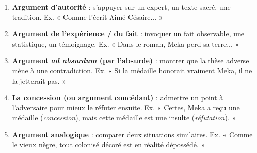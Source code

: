 \documentclass[11pt]{article}
\begin{document}
\begin{methode}
\begin{enumerate}
    \item \textbf{Argument d'autorité} : s'appuyer sur un expert, un texte sacré, une tradition. Ex. « Comme l'écrit Aimé Césaire... »
    \item \textbf{Argument de l'expérience / du fait} : invoquer un fait observable, une statistique, un témoignage. Ex. « Dans le roman, Meka perd sa terre... »
    \item \textbf{Argument \emph{ad absurdum} (par l'absurde)} : montrer que la thèse adverse mène à une contradiction. Ex. « Si la médaille honorait vraiment Meka, il ne la jetterait pas. »
    \item \textbf{La concession (ou argument concédant)} : admettre un point à l'adversaire pour mieux le réfuter ensuite. Ex. « Certes, Meka a reçu une médaille (\emph{concession}), mais cette médaille est une insulte (\emph{réfutation}). »
    \item \textbf{Argument analogique} : comparer deux situations similaires. Ex. « Comme le vieux nègre, tout colonisé décoré est en réalité dépossédé. »
\end{enumerate}
\end{methode}
\end{document}
